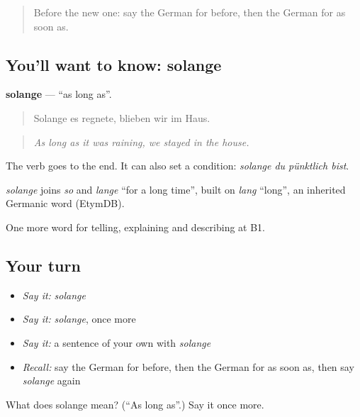 \begin{quote}
Before the new one: say the German for before, then the German for as soon as.
\end{quote}

\subsection*{You'll want to know: solange}
\textbf{solange} — \textquotedblleft{}as long as\textquotedblright{}.

\begin{quote}
Solange es regnete, blieben wir im Haus.
\end{quote}

\begin{quote}
\emph{As long as it was raining, we stayed in the house.}
\end{quote}

The verb goes to the end. It can also set a condition: \emph{solange du pünktlich bist}.

\begin{cousinweb}
\emph{solange} joins \emph{so} and \emph{lange} \textquotedblleft{}for a long time\textquotedblright{}, built on \emph{lang} \textquotedblleft{}long\textquotedblright{}, an inherited Germanic word (EtymDB).
\end{cousinweb}

\begin{grammarlens}[title={What you've built}]
One more word for telling, explaining and describing at B1.
\end{grammarlens}

\subsection*{Your turn}
\begin{itemize}
\raggedright
  \item \emph{Say it:} \emph{solange}
  \item \emph{Say it:} \emph{solange}, once more
  \item \emph{Say it:} a sentence of your own with \emph{solange}
  \item \emph{Recall:} say the German for before, then the German for as soon as, then say \emph{solange} again
\end{itemize}

\begin{tcolorbox}[breakable,colback=teal!4,colframe=teal!35!black,title={Before you move on}]
What does solange mean? (\textquotedblleft{}As long as\textquotedblright{}.) Say it once more.
\end{tcolorbox}
